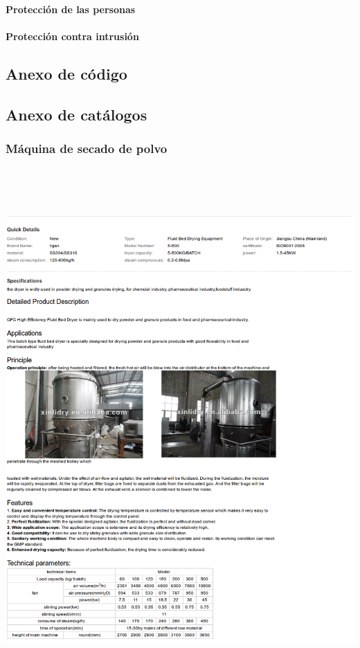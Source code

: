\paragraph{Protección de las personas}
\paragraph{Protección contra intrusión}

\subsection{Anexo de código}
\newpage
\subsection{Anexo de catálogos}
\subsubsection{Máquina de secado de polvo}
\includegraphics[width=15cm,height=20cm,keepaspectratio]{Datasheets/1MaquinaSecado.png} 
\newpage

